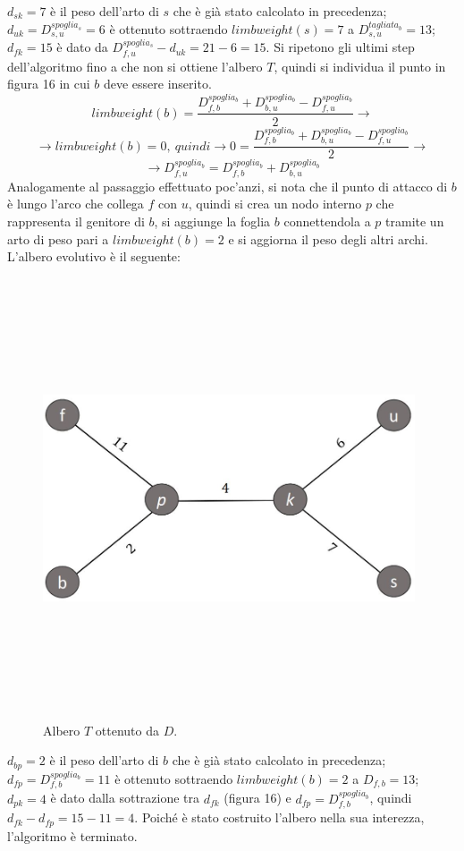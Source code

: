 $d_{sk}=7$ è il peso dell'arto di $s$ che è già stato calcolato in precedenza; $d_{uk}=D^{spoglia_{s}}_{s,u}=6$ è ottenuto sottraendo $limbweight(s)=7$ a \newline $D^{tagliata_{b}}_{s,u}=13$; $d_{fk}=15$ è dato da $D^{spoglia_{s}}_{f,u}-d_{uk}=21-6=15$.
\newline
Si ripetono gli ultimi step dell'algoritmo fino a che non si ottiene l'albero $T$, quindi si individua il punto in figura 16 in cui $b$ deve essere inserito.
\[
limbweight(b)=\frac{D^{spoglia_{b}}_{f,b}+D^{spoglia_{b}}_{b,u}-D^{spoglia_{b}}_{f,u}}{2} \rightarrow\]
\[ \rightarrow limbweight(b)=0,\: quindi\rightarrow 0=\frac{D^{spoglia_{b}}_{f,b}+D^{spoglia_{b}}_{b,u}-D^{spoglia_{b}}_{f,u}}{2}\rightarrow\]
\[\rightarrow D^{spoglia_{b}}_{f,u}=D^{spoglia_{b}}_{f,b}+D^{spoglia_{b}}_{b,u}
\]
Analogamente al passaggio effettuato poc'anzi, si nota che il punto di attacco di $b$ è lungo l'arco che collega $f$ con $u$, quindi si crea un nodo interno $p$ che rappresenta il genitore di $b$,
si aggiunge la foglia $b$ connettendola a $p$ tramite un arto di peso pari a
$limbweight(b)=2$ e si aggiorna il peso degli altri archi.
\newpage
L'albero evolutivo è il seguente:
\begin{figure}[h!]
\centering
	\includegraphics[height=13cm, width=11cm, keepaspectratio]{additive_tree_4.jpg}
 	\caption{Albero $T$ ottenuto da $D$.}
  	\label{fig:additivePhylogeny_4}
\end{figure}
\newline
$d_{bp}=2$ è il peso dell'arto di $b$ che è già stato calcolato in precedenza; $d_{fp}=D^{spoglia_{b}}_{f,b}=11$ è ottenuto sottraendo $limbweight(b)=2$ a $D_{f,b}=13$; $d_{pk}=4$ è dato dalla sottrazione tra $d_{fk}$ (figura 16) e $d_{fp}=D^{spoglia_{b}}_{f,b}$, quindi $d_{fk}-d_{fp}=15-11=4$.
\newline
Poiché è stato costruito l'albero nella sua interezza, l'algoritmo è terminato.

